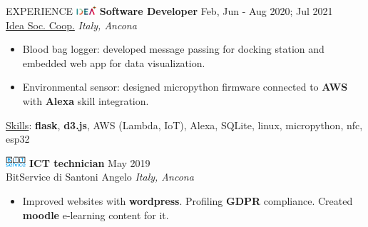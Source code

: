 \documentclass{cv} %
\def\intraexpvspace{0.15cm}
\def\titlelistvspace{-0.15cm}
\begin{document}
\begin{rSection}{EXPERIENCE}
    \includegraphics[width=0.75cm, trim={0cm 1.5cm 0cm 0cm}]{idea-icon.png}
    \textbf{Software Developer} \hfill Feb, Jun - Aug 2020; Jul 2021\\
    \hspace*{0.85cm}\href{https://idea-on-line.it/}{Idea Soc. Coop.} \hfill \textit{Italy, Ancona}
    \vspace{\titlelistvspace}\begin{itemize}
        \itemsep -3pt {}
        \item Blood bag logger: developed message passing for docking station and embedded web app for data visualization.
        \item Environmental sensor: designed micropython firmware
              connected to \textbf{AWS}
              with \textbf{Alexa} skill integration.
    \end{itemize}
    \vspace*{-0.1cm}\hspace*{0.5cm}\underline{Skills}:
    \textbf{flask},
    \textbf{d3.js},
    AWS (Lambda, IoT),
    Alexa,
    SQLite,
    linux,
    micropython,
    nfc,
    esp32
    \vspace{\intraexpvspace}

    \includegraphics[width=0.75cm, trim={0cm 1.5cm 0cm 0cm}]{bitservice-icon.png}
    \textbf{ICT technician} \hfill May 2019 \\
    \hspace*{0.85cm}BitService di Santoni Angelo \hfill \textit{Italy, Ancona}
    \vspace{\titlelistvspace}\begin{itemize}
        \itemsep -3pt {}
        \item Improved websites with \textbf{wordpress}.
              Profiling \textbf{GDPR} compliance.
              Created \textbf{moodle} e-learning content for it. %
    \end{itemize}

\end{rSection}
\end{document}
